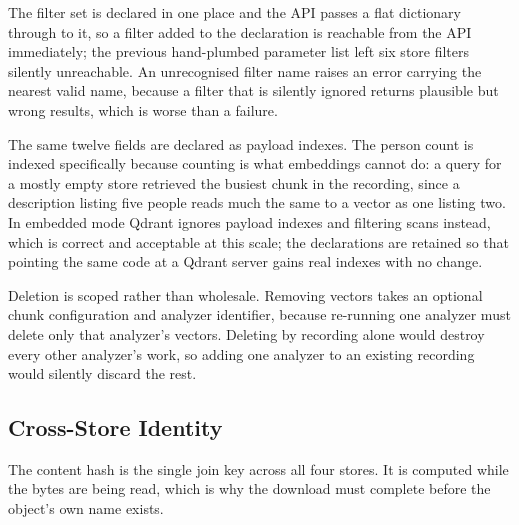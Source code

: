 The filter set is declared in one place and the API passes a flat dictionary through to
it, so a filter added to the declaration is reachable from the API immediately; the
previous hand-plumbed parameter list left six store filters silently unreachable. An
unrecognised filter name raises an error carrying the nearest valid name, because a
filter that is silently ignored returns plausible but wrong results, which is worse than
a failure.

The same twelve fields are declared as payload indexes. The person count is indexed
specifically because counting is what embeddings cannot do: a query for a mostly empty
store retrieved the busiest chunk in the recording, since a description listing five
people reads much the same to a vector as one listing two. In embedded mode Qdrant
ignores payload indexes and filtering scans instead, which is correct and acceptable at
this scale; the declarations are retained so that pointing the same code at a Qdrant
server gains real indexes with no change.

Deletion is scoped rather than wholesale. Removing vectors takes an optional chunk
configuration and analyzer identifier, because re-running one analyzer must delete only
that analyzer's vectors. Deleting by recording alone would destroy every other analyzer's
work, so adding one analyzer to an existing recording would silently discard the rest.

\subsection{Cross-Store Identity}

The content hash is the single join key across all four stores. It is computed while the
bytes are being read, which is why the download must complete before the object's own
name exists.

